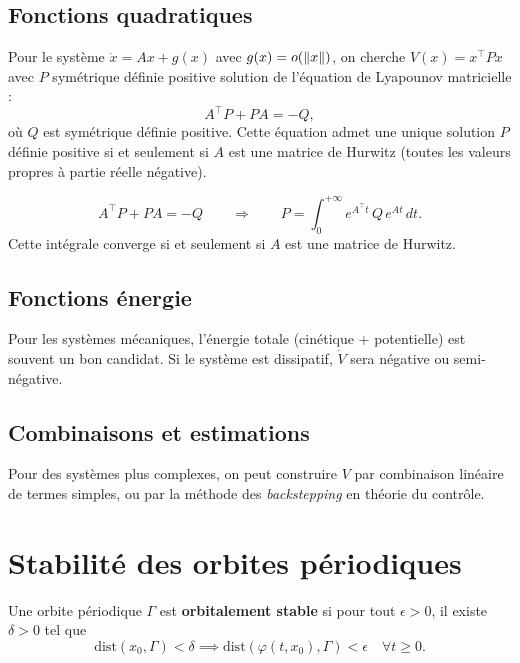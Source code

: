 \subsection{Fonctions quadratiques}

Pour le syst\`eme $\dot{x} = Ax + g(x)$ avec $g(x) = o(\left\| x \right\|)$, on
cherche $V(x) = x^\top P x$ avec $P$ sym\'etrique d\'efinie positive solution
de l'\'equation de Lyapounov matricielle :
\[
    A^\top P + PA = -Q,
\]
o\`u $Q$ est sym\'etrique d\'efinie positive. Cette \'equation admet une unique
solution $P$ d\'efinie positive si et seulement si $A$ est une matrice de
Hurwitz (toutes les valeurs propres \`a partie r\'eelle n\'egative).

\begin{formules}[title=\textbf{\'Equation de Lyapounov matricielle}]
\[
    A^\top P + PA = -Q \qquad \Longrightarrow \qquad
    P = \int_0^{+\infty} e^{A^\top t}\, Q\, e^{At}\, dt.
\]
Cette int\'egrale converge si et seulement si $A$ est une matrice de Hurwitz.
\end{formules}

\subsection{Fonctions \'energie}

Pour les syst\`emes m\'ecaniques, l'\'energie totale (cin\'etique + potentielle)
est souvent un bon candidat. Si le syst\`eme est dissipatif, $\dot{V}$ sera
n\'egative ou semi-n\'egative.

\subsection{Combinaisons et estimations}

Pour des syst\`emes plus complexes, on peut construire $V$ par combinaison
lin\'eaire de termes simples, ou par la m\'ethode des \emph{backstepping} en
th\'eorie du contr\^ole.

\section{Stabilit\'e des orbites p\'eriodiques}

\begin{definition}
Une orbite p\'eriodique $\Gamma$ est \textbf{orbitalement stable} si pour tout
$\epsilon > 0$, il existe $\delta > 0$ tel que
\[
    \mathrm{dist}(x_0, \Gamma) < \delta \implies
    \mathrm{dist}(\varphi(t, x_0), \Gamma) < \epsilon \quad \forall t \geq 0.
\]
\end{definition}


